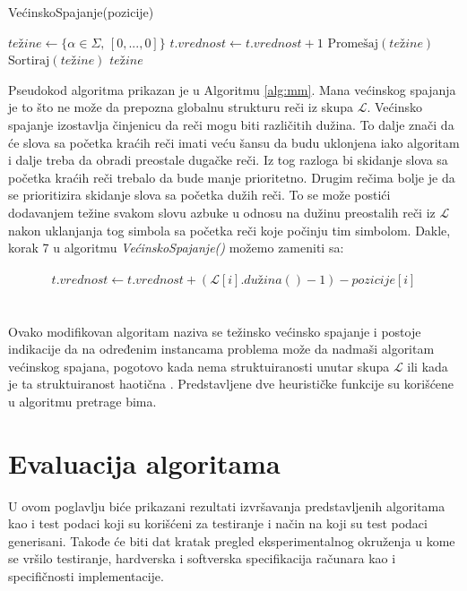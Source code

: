 \documentclass[12pt,oneside]{memoir}
\begin{document}
\begin{algorithm}
  \caption{\textrm{VećinskoSpajanje(pozicije)}}
  \label{alg:mm}
  \begin{algorithmic}[1]
  \State $te\textrm{ž}ine \gets \{\alpha \in \Sigma\textrm{, }[0,...,0] \}$ 
  \State
          \State $t.vrednost \gets t.vrednost + 1$
        \EndIf 
      \EndFor
    \EndIf 
  \EndFor
  \State
  \State $\textrm{Promešaj}(te\textrm{ž}ine)$
  \State $\textrm{Sortiraj}(te\textrm{ž}ine)$
  \State
  \State \Return $te\textrm{ž}ine$
  \end{algorithmic}
  \end{algorithm}

Pseudokod algoritma prikazan je u Algoritmu \ref{alg:mm}.
Mana većinskog spajanja je to što ne može da prepozna globalnu strukturu reči iz skupa $\mathcal{L}$.
Većinsko spajanje izostavlja činjenicu da reči mogu biti različitih dužina. To dalje 
znači da će slova sa početka kraćih reči imati veću šansu da budu uklonjena iako algoritam i dalje treba
da obradi preostale dugačke reči. Iz tog razloga bi skidanje slova sa početka kraćih reči trebalo da bude
manje prioritetno. Drugim rečima bolje je da se prioritizira skidanje slova sa početka dužih reči.
To se može postići dodavanjem težine svakom slovu azbuke u odnosu na dužinu preostalih reči iz $\mathcal{L}$ 
nakon uklanjanja tog simbola sa početka reči koje počinju tim simbolom. Dakle, korak 7 u algoritmu \textit{VećinskoSpajanje()}
možemo zameniti sa:
\\
\\
\begin{equation}
  \label{eqn:wmm}
  t.vrednost \gets t.vrednost + (\mathcal{L}[i].du\textrm{ž}ina() - 1) - pozicije[i]
\end{equation}
\\
\\
Ovako modifikovan algoritam naziva se težinsko većinsko spajanje i postoje indikacije da na određenim instancama
problema može da nadmaši algoritam većinskog spajana, pogotovo kada nema struktuiranosti unutar skupa $\mathcal{L}$
ili kada je ta struktuiranost haotična \cite{ProbabilisticBS}. Predstavljene dve heurističke
funkcije su korišćene u algoritmu pretrage bima.

\chapter{Evaluacija algoritama}
\label{chap:evaluacijaAlg}
U ovom poglavlju biće prikazani rezultati izvršavanja predstavljenih algoritama
kao i test podaci koji su korišćeni za testiranje i način na koji su test podaci generisani.
Takođe će biti dat kratak pregled eksperimentalnog okruženja u kome se vršilo testiranje,
hardverska i softverska specifikacija računara kao i specifičnosti implementacije.
\end{document}
